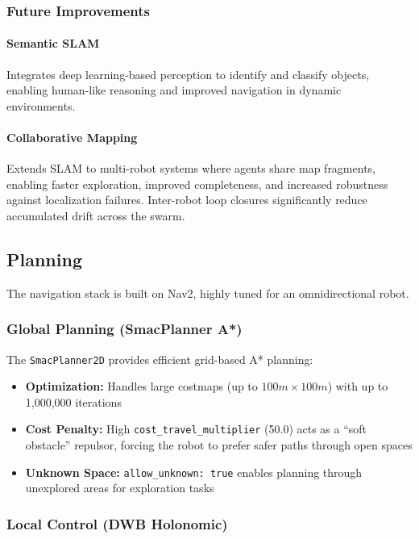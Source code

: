 \subsubsection{Future Improvements}

\paragraph{Semantic SLAM}
Integrates deep learning-based perception to identify and classify objects, enabling human-like reasoning and improved navigation in dynamic environments.

\paragraph{Collaborative Mapping}
Extends SLAM to multi-robot systems where agents share map fragments, enabling faster exploration, improved completeness, and increased robustness against localization failures. Inter-robot loop closures significantly reduce accumulated drift across the swarm.


\subsection{Planning}
\label{subsec:planning}

The navigation stack is built on Nav2, highly tuned for an omnidirectional robot.

\subsubsection{Global Planning (SmacPlanner A*)}

The \texttt{SmacPlanner2D} provides efficient grid-based A* planning:
\begin{itemize}
    \item \textbf{Optimization:} Handles large costmaps (up to $100m \times 100m$) with up to 1,000,000 iterations
    \item \textbf{Cost Penalty:} High \texttt{cost\_travel\_multiplier} (50.0) acts as a ``soft obstacle'' repulsor, forcing the robot to prefer safer paths through open spaces
    \item \textbf{Unknown Space:} \texttt{allow\_unknown: true} enables planning through unexplored areas for exploration tasks
\end{itemize}

\subsubsection{Local Control (DWB Holonomic)}

